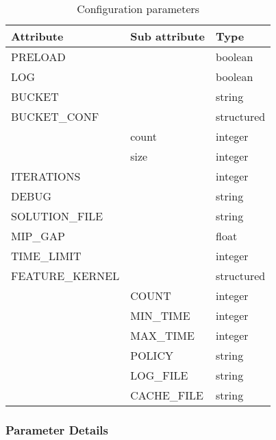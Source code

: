         \begin{table}[h]
            \centering
            \caption{Configuration parameters}
            \begin{tabular}{ | l | l | l | }
                \hline
                Attribute & Sub attribute & Type \\
                \hline
                \hline
                PRELOAD& & boolean\\ 
                \hline
                 LOG& & boolean\\ 
                \hline
                 BUCKET& & string\\ 
                \hline
                BUCKET\_CONF & & structured\\ 
                \hline
                & count & integer\\ 
                \hline
                & size & integer\\ 
                \hline
                 ITERATIONS& & integer\\ 
                \hline
                 DEBUG& & string\\ 
                \hline
                 SOLUTION\_FILE& & string\\ 
                \hline
                 MIP\_GAP& & float\\ 
                \hline
                TIME\_LIMIT & & integer \\
                \hline
                FEATURE\_KERNEL & & structured\\ 
                \hline
                & COUNT & integer\\ 
                \hline
                & MIN\_TIME & integer\\ 
                \hline
                & MAX\_TIME & integer\\ 
                \hline
                & POLICY & string\\ 
                \hline
                & LOG\_FILE & string\\ 
                \hline
                & CACHE\_FILE & string\\ 
                \hline        
            \end{tabular}
            \label{tab:params}
        \end{table}
    
        \subsubsection{Parameter Details}
    
